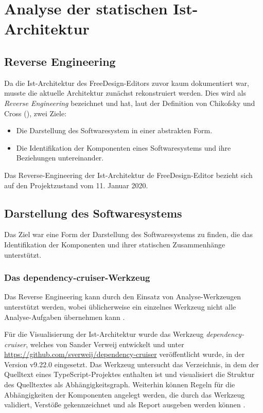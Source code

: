 \section{Analyse der statischen Ist-Architektur}

\subsection{Reverse Engineering}
Da die Ist-Architektur des FreeDesign-Editors zuvor kaum dokumentiert war, musste die aktuelle Architektur zunächst rekonstruiert werden. 
Dies wird als \emph{Reverse Engineering} bezeichnet und hat, laut der Definition von Chikofsky und Cross (\citeyear[S. 13-17]{Chikofsky1990}), zwei Ziele: 
\begin{itemize}
    \item Die Darstellung des Softwaresystem in einer abstrakten Form. 
    \item Die Identifikation der Komponenten eines Softwaresystems und ihre Beziehungen untereinander. 
\end{itemize}
Das Reverse-Engineering der Ist-Architektur de FreeDesign-Editor bezieht sich auf den Projektzustand vom 11. Januar 2020. 

\subsection{Darstellung des Softwaresystems}
Das Ziel war eine Form der Darstellung des Softwaresystems zu finden, die das Identifikation der Komponenten und ihrer statischen Zusammenhänge unterstützt.

\subsubsection{Das {dependency-cruiser}-Werkzeug}
Das Reverse Engineering kann durch den Einsatz von Analyse-Werkzeugen unterstützt werden, wobei üblicherweise ein einzelnes Werkzeug nicht alle Analyse-Aufgaben übernehmen kann \autocite[vgl.][381]{Bass2013}.  

Für die Visualisierung der Ist-Architektur wurde das Werkzeug \emph{dependency-cruiser}, welches von Sander Verweij entwickelt und unter \url{https://github.com/sverweij/dependency-cruiser} veröffentlicht wurde, in der Version v9.22.0 eingesetzt. 
Das Werkzeug untersucht das Verzeichnis, in dem der Quelltext eines TypeScript-Projektes enthalten ist und visualisiert die Struktur des Quelltextes als Abhängigkeitsgraph. Weiterhin können Regeln für die Abhängigkeiten der Komponenten angelegt werden, die durch das Werkzeug validiert, Verstöße gekennzeichnet und als Report ausgeben werden können \autocite[vgl.][]{Verweij:Dependency}. 

